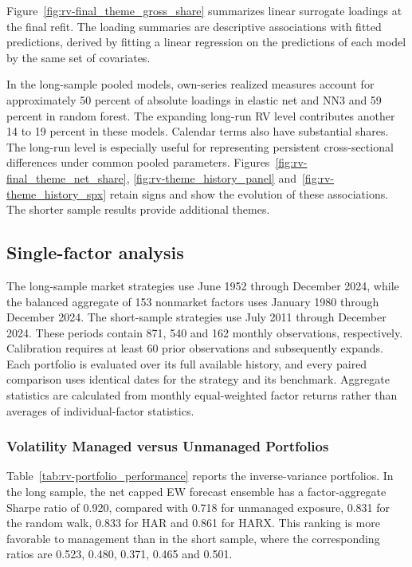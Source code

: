\documentclass[preprint,12pt,authoryear]{elsarticle}
\begin{document}
Figure~\ref{fig:rv-final_theme_gross_share} summarizes linear surrogate loadings at the final refit. The loading summaries are descriptive associations with fitted predictions, derived by fitting a linear regression on the predictions of each model by the same set of covariates.

 In the long-sample pooled models, own-series realized measures account for approximately 50 percent of absolute loadings in elastic net and NN3 and 59 percent in random forest. The expanding long-run RV level contributes another 14 to 19 percent in these models. Calendar terms also have substantial shares. The long-run level is especially useful for representing persistent cross-sectional differences under common pooled parameters.  Figures~\ref{fig:rv-final_theme_net_share}, \ref{fig:rv-theme_history_panel} and~\ref{fig:rv-theme_history_spx} retain signs and show the evolution of these associations. The shorter sample results provide additional themes.

\subsection{Single-factor analysis}
\label{sec:single-factor-results}

The long-sample market strategies use June 1952 through December 2024, while the balanced aggregate of 153 nonmarket factors uses January 1980 through December 2024. The short-sample strategies use July 2011 through December 2024. These periods contain 871, 540 and 162 monthly observations, respectively. Calibration requires at least 60 prior observations and subsequently expands. Each portfolio is evaluated over its full available history, and every paired comparison uses identical dates for the strategy and its benchmark. Aggregate statistics are calculated from monthly equal-weighted factor returns rather than averages of individual-factor statistics.

\subsubsection{Volatility Managed versus Unmanaged Portfolios}

Table~\ref{tab:rv-portfolio_performance} reports the inverse-variance portfolios. In the long sample, the net capped EW forecast ensemble has a factor-aggregate Sharpe ratio of 0.920, compared with 0.718 for unmanaged exposure, 0.831 for the random walk, 0.833 for HAR and 0.861 for HARX. This ranking is more favorable to management than in the short sample, where the corresponding ratios are 0.523, 0.480, 0.371, 0.465 and 0.501.
\end{document}
